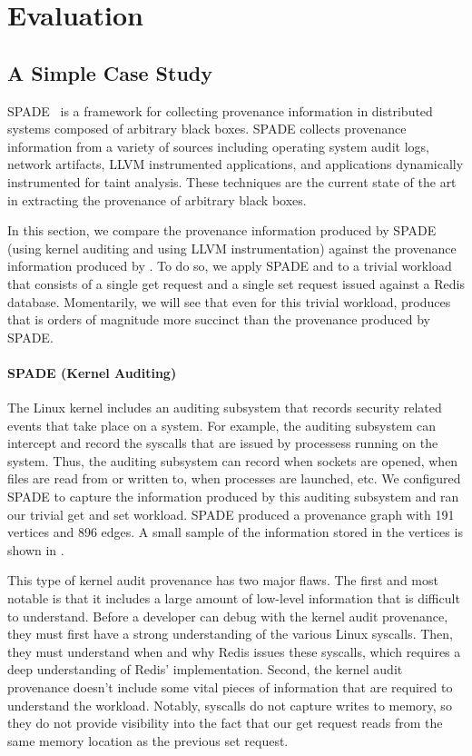 \section{Evaluation}

\subsection{A Simple Case Study}
SPADE~\cite{gehani2012spade} is a framework for collecting provenance
information in distributed systems composed of arbitrary black boxes. SPADE
collects provenance information from a variety of sources including operating
system audit logs, network artifacts, LLVM instrumented applications, and
applications dynamically instrumented for taint analysis. These techniques are
the current state of the art in extracting the provenance of arbitrary black
boxes.

In this section, we compare the provenance information produced by SPADE (using
kernel auditing and using LLVM instrumentation) against the provenance
information produced by \fluent{}. To do so, we apply SPADE and \fluent{} to a
trivial workload that consists of a single get request and a single set request
issued against a Redis database. Momentarily, we will see that even for this
trivial workload, \fluent{} produces \watprovenance{} that is orders of
magnitude more succinct than the provenance produced by SPADE.

{}

\paragraph{SPADE (Kernel Auditing)}
The Linux kernel includes an auditing subsystem that records security related
events that take place on a system. For example, the auditing subsystem can
intercept and record the syscalls that are issued by processess running on the
system. Thus, the auditing subsystem can record when sockets are opened, when
files are read from or written to, when processes are launched, etc. We
configured SPADE to capture the information produced by this auditing subsystem
and ran our trivial get and set workload. SPADE produced a provenance graph
with 191 vertices and 896 edges. A small sample of the information stored in
the vertices is shown in .

This type of kernel audit provenance has two major flaws. The first and most
notable is that it includes a large amount of low-level information that is
difficult to understand. Before a developer can debug with the kernel audit
provenance, they must first have a strong understanding of the various Linux
syscalls. Then, they must understand when and why Redis issues these syscalls,
which requires a deep understanding of Redis' implementation. Second, the
kernel audit provenance doesn't include some vital pieces of information that
are required to understand the workload. Notably, syscalls do not capture
writes to memory, so they do not provide visibility into the fact that our get
request reads from the same memory location as the previous set request.

